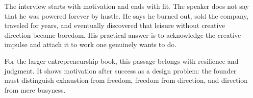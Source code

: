 The interview starts with motivation and ends with fit. The speaker does not say that he was powered forever by hustle. He says he burned out, sold the company, traveled for years, and eventually discovered that leisure without creative direction became boredom. His practical answer is to acknowledge the creative impulse and attach it to work one genuinely wants to do.

For the larger entrepreneurship book, this passage belongs with resilience and judgment. It shows motivation after success as a design problem: the founder must distinguish exhaustion from freedom, freedom from direction, and direction from mere busyness.